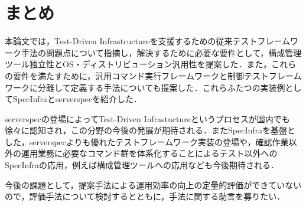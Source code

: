\section{まとめ}

本論文では，Test-Driven Infrastructureを支援するための従来テストフレームワーク手法の問題点について指摘し，解決するために必要な要件として，構成管理ツール独立性とOS・ディストリビューション汎用性を提案した．また，これらの要件を満たすために，汎用コマンド実行フレームワークと制御テストフレームワークに分離して定義する手法についても提案した．これらふたつの実装例としてSpecInfraとserverspecを紹介した．

serverspecの登場によってTest-Driven Infrastuctureというプロセスが国内でも徐々に認知され，この分野の今後の発展が期待される．またSpecInfraを基盤とした，serverspecよりも優れたテストフレームワーク実装の登場や，確認作業以外の運用業務に必要なコマンド群を体系化することによるテスト以外へのSpecInfraの応用，例えば構成管理ツールへの応用なども今後期待される．

今後の課題として，提案手法による運用効率の向上の定量的評価ができていないので，評価手法について検討するとともに，手法に関する助言を募りたい．

